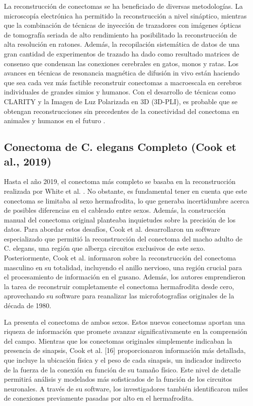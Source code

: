 La reconstrucción de conectomas se ha beneficiado de diversas metodologías. La microscopía electrónica ha permitido la reconstrucción a nivel sináptico, mientras que la combinación de técnicas de inyección de trazadores con imágenes ópticas de tomografía seriada de alto rendimiento ha posibilitado la reconstrucción de alta resolución en ratones. Además, la recopilación sistemática de datos de una gran cantidad de experimentos de trazado ha dado como resultado matrices de consenso que condensan las conexiones cerebrales en gatos, monos y ratas. Los avances en técnicas de resonancia magnética de difusión in vivo están haciendo que sea cada vez más factible reconstruir conectomas a macroescala en cerebros individuales de grandes simios y humanos. Con el desarrollo de técnicas como CLARITY y la Imagen de Luz Polarizada en 3D (3D-PLI), es probable que se obtengan reconstrucciones sin precedentes de la conectividad del conectoma en animales y humanos en el futuro \cite{heuvel_comparative_2016}.


\subsection{Conectoma de C. elegans Completo (Cook et al., 2019)}

Hasta el año 2019, el conectoma más completo se basaba en la reconstrucción realizada por White et al. \cite{white_structure_1997}. No obstante, es fundamental tener en cuenta que este conectoma se limitaba al sexo hermafrodita, lo que generaba incertidumbre acerca de posibles diferencias en el cableado entre sexos.  Además, la construcción manual del conectoma original planteaba inquietudes sobre la precisión de los datos. Para abordar estos desafíos, Cook et al. \cite{cook_whole-animal_2019} desarrollaron un software especializado que permitió la reconstrucción del conectoma del macho adulto de C. elegans, una región que alberga circuitos exclusivos de este sexo. Posteriormente, Cook et al. \cite{cook_whole-animal_2019} informaron sobre la reconstrucción del conectoma masculino en su totalidad, incluyendo el anillo nervioso, una región crucial para el procesamiento de información en el gusano. Además, los autores emprendieron la tarea de reconstruir completamente el conectoma hermafrodita desde cero, aprovechando su software para reanalizar las microfotografías originales de la década de 1980. 

La  presenta el conectoma de ambos sexos. Estos nuevos conectomas aportan una riqueza de información que promete avanzar significativamente en la comprensión del campo. Mientras que los conectomas originales simplemente indicaban la presencia de sinapsis, Cook et al. [16] proporcionaron información más detallada, que incluye la ubicación física y el peso de cada sinapsis, un indicador indirecto de la fuerza de la conexión en función de su tamaño físico. Este nivel de detalle permitirá análisis y modelados más sofisticados de la función de los circuitos neuronales. A través de su software, los investigadores también identificaron miles de conexiones previamente pasadas por alto en el hermafrodita. 

